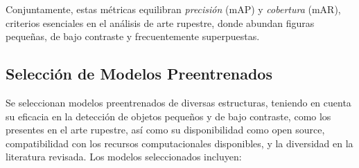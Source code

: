 Conjuntamente, estas métricas equilibran \emph{precisión} (mAP) y \emph{cobertura} (mAR), criterios esenciales en el análisis de arte rupestre, donde abundan figuras pequeñas, de bajo contraste y frecuentemente superpuestas.


\subsection{Selección de Modelos Preentrenados}
Se seleccionan modelos preentrenados de diversas estructuras, teniendo en cuenta su eficacia en la detección de objetos pequeños y de bajo contraste, como los presentes en el arte rupestre, así como su disponibilidad como open source, compatibilidad con los recursos computacionales disponibles, y la diversidad en la literatura revisada.
Los modelos seleccionados incluyen:

